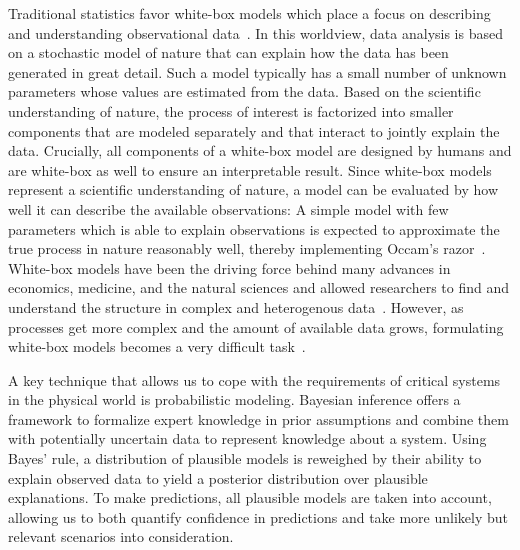 Traditional statistics favor white-box models which place a focus on describing and understanding observational data~\parencite{andrew_gelman_bayesian_2013,casella_statistical_2002,cox_planning_1958}.
In this worldview, data analysis is based on a stochastic model of nature that can explain how the data has been generated in great detail.
Such a model typically has a small number of unknown parameters whose values are estimated from the data.
Based on the scientific understanding of nature, the process of interest is factorized into smaller components that are modeled separately and that interact to jointly explain the data.
Crucially, all components of a white-box model are designed by humans and are white-box as well to ensure an interpretable result.
Since white-box models represent a scientific understanding of nature, a model can be evaluated by how well it can describe the available observations:
A simple model with few parameters which is able to explain observations is expected to approximate the true process in nature reasonably well, thereby implementing Occam's razor~\parencite{thorburn_occams_1915}.
White-box models have been the driving force behind many advances in economics, medicine, and the natural sciences and allowed researchers to find and understand the structure in complex and heterogenous data~\parencite{efron_modern_2005,giulio_d._agostini_bayesian_2003}.
However, as processes get more complex and the amount of available data grows, formulating white-box models becomes a very difficult task~\parencite{sutton_bitter_2019}.

A key technique that allows us to cope with the requirements of critical systems in the physical world is probabilistic modeling.
Bayesian inference offers a framework to formalize expert knowledge in prior assumptions and combine them with potentially uncertain data to represent knowledge about a system.
Using Bayes' rule, a distribution of plausible models is reweighed by their ability to explain observed data to yield a posterior distribution over plausible explanations.
To make predictions, all plausible models are taken into account, allowing us to both quantify confidence in predictions and take more unlikely but relevant scenarios into consideration.

